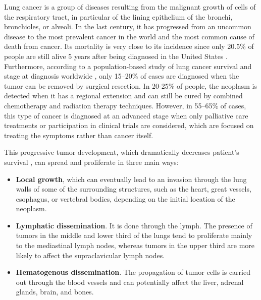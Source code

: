 Lung cancer is a group of diseases resulting from the malignant growth of cells of the respiratory tract, in particular of the lining epithelium of the bronchi, bronchioles, or alveoli. In the last century, it has progressed from an uncommon disease to the most prevalent cancer in the world and the most common cause of death from cancer. Its mortality is very close to its incidence since only 20.5\% of people are still alive 5 years after being diagnosed in the United States \cite{SEER}. Furthermore, according to a population-based study of lung cancer survival and stage at diagnosis worldwide \cite{Walters}, only 15–20\% of cases are diagnosed when the tumor can be removed by surgical resection. In 20-25\% of people, the neoplasm is detected when it has a regional extension and can still be cured by combined chemotherapy and radiation therapy techniques. However, in 55–65\% of cases, this type of cancer is diagnosed at an advanced stage when only palliative care treatments or participation in clinical trials are considered, which are focused on treating the symptoms rather than cancer itself.

This progressive tumor development, which dramatically decreases patient's survival \cite{SEER}, can spread and proliferate in three main ways:
\begin{itemize}
    \item \textbf{Local growth}, which can eventually lead to an invasion through the lung walls of some of the surrounding structures, such as the heart, great vessels, esophagus, or vertebral bodies, depending on the initial location of the neoplasm.
    \item \textbf{Lymphatic dissemination}. It is done through the lymph. The presence of tumors in the middle and lower third of the lungs tend to proliferate mainly to the mediastinal lymph nodes, whereas tumors in the upper third are more likely to affect the supraclavicular lymph nodes.
    \item \textbf{Hematogenous dissemination}. The propagation of tumor cells is carried out through the blood vessels and can potentially affect the liver, adrenal glands, brain, and bones.
\end{itemize}


